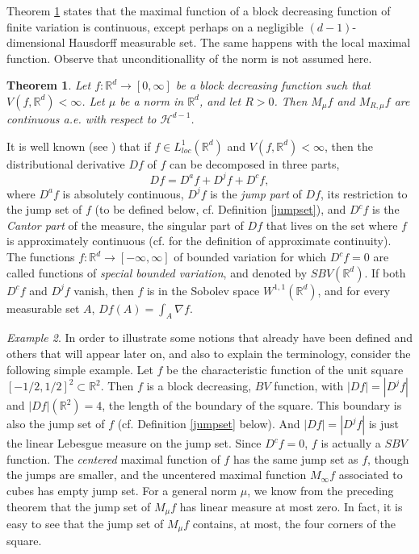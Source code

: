 \documentclass[12pt]{amsart}
\numberwithin{equation}{section}
\theoremstyle{plain}
\newtheorem{theorem}{Theorem}
\theoremstyle{definition}
\theoremstyle{remark}
\newtheorem{example}[theorem]{Example}
\begin{document}
 Theorem \ref{t2} states that the maximal function of a block
 decreasing function of finite
variation is continuous, except perhaps on a negligible $(d-1)$-dimensional
Hausdorff measurable set. The same happens with the local maximal
function. Observe that   unconditionallity of the norm is not
assumed here.

\begin{theorem}\label{t2}
  Let $f:\mathbb{R}^d\to [0,\infty]$ be a block decreasing function such that
   $V(f,\mathbb{R}^d)<\infty$. Let $\mu$ be a norm in $\mathbb{R}^d$,
   and let $R > 0$.
   Then $M_\mu f$ and $M_{R,\mu} f$ are continuous a.e. with respect to $\mathcal{H}^{d-1}$.
\end{theorem}

It is well known (see \cite[pp. 184--186]{AFP}) that if $f\in
L^1_{loc}(\mathbb{R}^d)$ and $V(f,\mathbb{R}^d)<\infty$, then the
distributional
derivative $Df$ of $f$  can be decomposed
in three parts,
\begin{equation*}
  Df=D^af+D^jf+D^c f,
\end{equation*}
where
 $D^af$ is
absolutely continuous, $D^jf$ is the {\em jump part} of $Df$,
its restriction to the jump set of $f$ (to be defined below, cf.
Definition \ref{jumpset}), and $D^cf$ is
the {\em Cantor part} of the measure, the singular part of
$Df$ that lives on the set where $f$ is
approximately continuous (cf. \cite[p. 160]{AFP} for the definition
of approximate continuity). The functions $f:\mathbb{R}^d\to [-\infty, \infty]$ of bounded variation for
which $D^cf=0$ are called functions
of {\em special
bounded variation}, and denoted by $SBV(\mathbb{R}^d)$. If both $D^cf$ and $D^jf$ vanish, then $f$
 is in the Sobolev space $W^{1,1}(\mathbb{R}^d)$, and
 for every measurable set $A$,
$Df (A) = \int_A \nabla f$.

 \begin{example} \label{square} In order to illustrate some notions that already
 have been defined and others that will appear later on, and also to explain the
 terminology, consider
 the following simple example. Let $f$ be
 the characteristic function  of the unit square $[-1/2, 1/2]^2\subset\mathbb{R}^2$. Then $f$ is a block decreasing, $BV$ function,
with $|Df| = |D^j f|$ and $|Df|(\mathbb{R}^2) = 4$, the length of the
boundary of the square. This boundary is also the jump set of $f$
(cf. Definition \ref{jumpset} below). And $|Df|= |D^j f|$ is just the linear Lebesgue measure
on the jump set. Since $D^cf=0$, $f$ is actually a $SBV$ function.
 The {\em centered} maximal function of $f$ has the
same jump set as $f$, though the jumps are smaller, and the uncentered
maximal function $M_\infty f$ associated to cubes has empty jump set.
For a general norm $\mu$, we know from the preceding theorem that
the jump set of  $M_\mu f$ has linear measure at most zero. In fact, it is easy
to see that the
jump set of  $M_\mu f$ contains, at most, the four corners of the square.
 \end{example}
\end{document}
